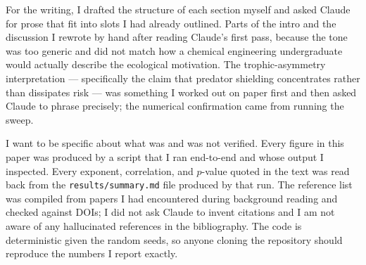 \documentclass[10pt,a4paper,twocolumn]{article}
\begin{document}
For the writing, I drafted the structure of each section myself and asked Claude for prose that fit into slots I had already outlined. Parts of the intro and the discussion I rewrote by hand after reading Claude's first pass, because the tone was too generic and did not match how a chemical engineering undergraduate would actually describe the ecological motivation. The trophic-asymmetry interpretation --- specifically the claim that predator shielding concentrates rather than dissipates risk --- was something I worked out on paper first and then asked Claude to phrase precisely; the numerical confirmation came from running the sweep.

I want to be specific about what was and was not verified. Every figure in this paper was produced by a script that I ran end-to-end and whose output I inspected. Every exponent, correlation, and $p$-value quoted in the text was read back from the \texttt{results/summary.md} file produced by that run. The reference list was compiled from papers I had encountered during background reading and checked against DOIs; I did not ask Claude to invent citations and I am not aware of any hallucinated references in the bibliography. The code is deterministic given the random seeds, so anyone cloning the repository should reproduce the numbers I report exactly.
\end{document}
